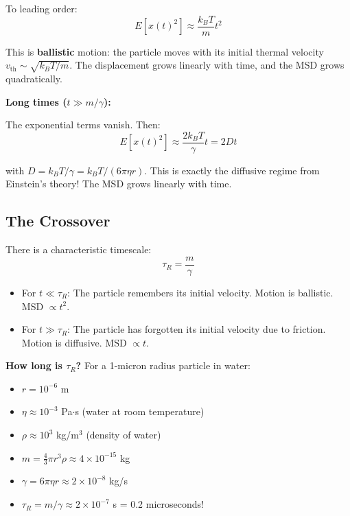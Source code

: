 \documentclass[11pt,a4paper]{article}
\begin{document}
	To leading order:
	\begin{equation}
		E[x(t)^2] \approx \frac{k_B T}{m} t^2
	\end{equation}
	
	This is \textbf{ballistic} motion: the particle moves with its initial thermal velocity $v_{\text{th}} \sim \sqrt{k_B T / m}$. The displacement grows linearly with time, and the MSD grows quadratically.
	
	\textbf{Long times ($t \gg m/\gamma$):}
	
	The exponential terms vanish. Then:
	\begin{equation}
		E[x(t)^2] \approx \frac{2k_B T}{\gamma} t = 2 D t
	\end{equation}
	
	with $D = k_B T / \gamma = k_B T / (6\pi \eta r)$. This is exactly the diffusive regime from Einstein's theory! The MSD grows linearly with time.
	
	\subsection{The Crossover}
	
	There is a characteristic timescale:
	\begin{equation}
		\tau_R = \frac{m}{\gamma}
	\end{equation}
	
	\begin{itemize}
		\item For $t \ll \tau_R$: The particle remembers its initial velocity. Motion is ballistic. MSD $\propto t^2$.
		\item For $t \gg \tau_R$: The particle has forgotten its initial velocity due to friction. Motion is diffusive. MSD $\propto t$.
	\end{itemize}
	
	\textbf{How long is $\tau_R$?} For a 1-micron radius particle in water:
	\begin{itemize}
		\item $r = 10^{-6}$ m
		\item $\eta \approx 10^{-3}$ Pa$\cdot$s (water at room temperature)
		\item $\rho \approx 10^3$ kg/m$^3$ (density of water)
		\item $m = \frac{4}{3}\pi r^3 \rho \approx 4 \times 10^{-15}$ kg
		\item $\gamma = 6\pi \eta r \approx 2 \times 10^{-8}$ kg/s
		\item $\tau_R = m/\gamma \approx 2 \times 10^{-7}$ s = 0.2 microseconds!
	\end{itemize}
	
\end{document}
